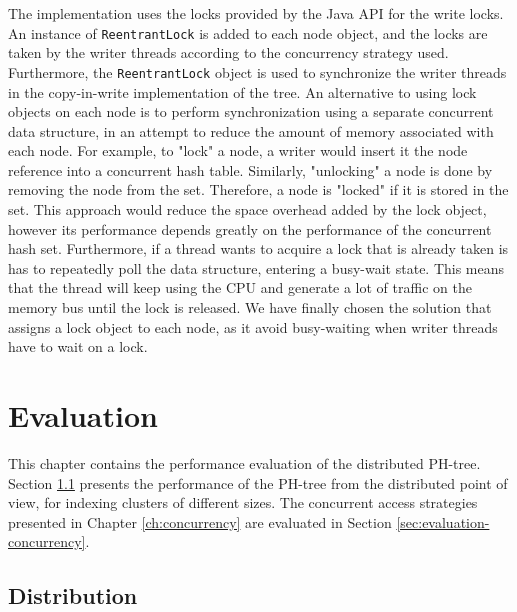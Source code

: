 \documentclass[11pt,a4paper]{globis-book}
\begin{document}
The implementation uses the locks provided by the Java API for the write locks. An instance of \texttt{ReentrantLock} is added to each node object, and the locks are taken by the writer threads according to the concurrency strategy used. Furthermore, the \texttt{ReentrantLock} object is used to synchronize the writer threads in the copy-in-write implementation of the tree. An alternative to using lock objects on each node is to perform synchronization using a separate concurrent data structure, in an attempt to reduce the amount of memory associated with each node. For example, to "lock" a node, a writer would insert it the node reference into a concurrent hash table. Similarly, "unlocking" a node is done by removing the node from the set. Therefore, a node is "locked" if it is stored in the set. This approach would reduce the space overhead added by the lock object, however its performance depends greatly on the performance of the concurrent hash set. Furthermore, if a thread wants to acquire a lock that is already taken is has to repeatedly poll the data structure, entering a busy-wait state. This means that the thread will keep using the CPU and generate a lot of traffic on the memory bus until the lock is released. We have finally chosen the solution that assigns a lock object to each node, as it avoid busy-waiting when writer threads have to wait on a lock.  

\chapter{Evaluation}
\label{ch:evaluation}

This chapter contains the performance evaluation of the distributed PH-tree. Section \ref{sec:evalution-distribution} presents the performance of the PH-tree from the distributed point of view, for indexing clusters of different sizes. The concurrent access strategies presented in Chapter \ref{ch:concurrency} are evaluated in Section \ref{sec:evaluation-concurrency}.

\section{Distribution}
\label{sec:evalution-distribution}
\end{document}
